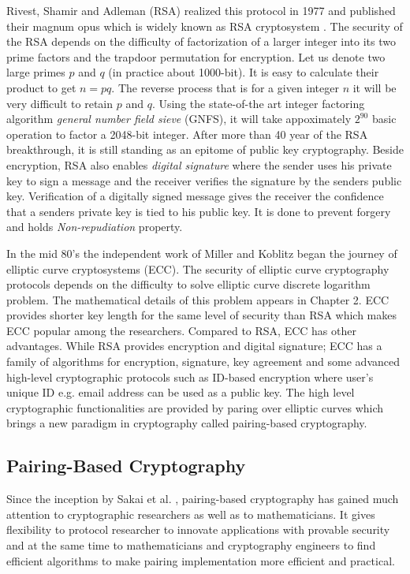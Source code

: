 Rivest, Shamir and Adleman (RSA) realized this protocol in 1977 and published their magnum opus which is widely known as RSA cryptosystem \cite{rivest1978method}. 
The security of the RSA depends on the difficulty of factorization of a larger integer into its two prime factors and the trapdoor permutation for encryption.
Let us denote  two large primes $p$ and $q$ (in practice about 1000-bit).
It is easy to calculate their product to get $n = pq$.
The reverse process that is for a given integer $n$ it will be very difficult to retain $p$ and $q$.
Using the state-of-the art integer factoring algorithm \textit{general number field sieve }(GNFS), it will take appoximately $2^{90}$ basic operation to factor a 2048-bit integer.
After more than 40 year of the RSA breakthrough, it is still standing as an epitome of public key cryptography.
Beside encryption, RSA also enables \textit{digital signature }where the sender uses his private key to sign a message and the receiver verifies the signature by the senders public key. 
Verification of a digitally signed message gives the receiver the confidence that a senders private key is tied to his public key.
It is done to prevent forgery and holds \textit{Non-repudiation} property.

In the mid 80's the independent work of Miller \cite{C:Miller85} and Koblitz \cite{koblitz1987elliptic} began the journey of elliptic curve cryptosystems (ECC). 
The security of  elliptic curve cryptography  protocols depends on the difficulty to solve elliptic curve discrete logarithm problem.
The mathematical details of this problem appears in Chapter 2. %
ECC provides shorter key length for the same level of security than RSA which makes ECC  popular among the researchers. 
Compared to RSA, ECC has other advantages. 
While RSA provides encryption and digital signature; ECC has a family of algorithms for encryption, signature, key agreement and some advanced high-level cryptographic protocols such as ID-based encryption \cite{AC:BonLynSha01} where user's unique ID e.g. email address can be used as a public key. 
The high level cryptographic functionalities are provided by paring over elliptic curves \cite{book_GPCMrabet2016} which brings a new paradigm in cryptography called pairing-based cryptography.

\subsection{Pairing-Based Cryptography}
\label{ch1_subsec_pbc}
Since the inception by Sakai et al. \cite{sakai2000cryptosystems}, pairing-based cryptography has gained much attention to cryptographic researchers as well as  to mathematicians. It gives flexibility to protocol researcher to innovate applications with provable security and at the same time to mathematicians and cryptography engineers to find efficient algorithms to make pairing implementation more efficient and practical.

